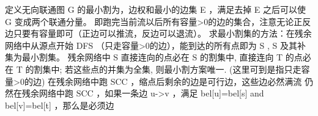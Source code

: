 \markdownRendererInterblockSeparator
{}定义无向联通图\markdownRendererDollarSign{} G \markdownRendererDollarSign{}的最小割为，边权和最小的边集\markdownRendererDollarSign{} E \markdownRendererDollarSign{}，满足去掉\markdownRendererDollarSign{} E \markdownRendererDollarSign{}之后可以使\markdownRendererDollarSign{} G \markdownRendererDollarSign{}变成两个联通分量。\markdownRendererInterblockSeparator
{}\markdownRendererInterblockSeparator
{}
\markdownRendererSectionEnd \markdownRendererSectionBegin
{}\markdownRendererInterblockSeparator
{}\markdownRendererSectionBegin
\markdownRendererSectionBegin
{}\markdownRendererInterblockSeparator
{}即跑完当前流以后所有容量>0的边的集合，注意无论正反边只要有容量即可（正边可以推流，反边可以退流）。\markdownRendererInterblockSeparator
{}
\markdownRendererSectionEnd \markdownRendererSectionBegin
{}\markdownRendererInterblockSeparator
{}求最小割集的方法：在残余网络中从源点开始\markdownRendererDollarSign{} DFS \markdownRendererDollarSign{}（只走容量>0的边），能到达的所有点即为\markdownRendererDollarSign{} S \markdownRendererDollarSign{},\markdownRendererDollarSign{} S \markdownRendererDollarSign{}及其补集为最小割集。\markdownRendererInterblockSeparator
{}
\markdownRendererSectionEnd \markdownRendererSectionBegin
{}\markdownRendererInterblockSeparator
{}残余网络中\markdownRendererDollarSign{} S \markdownRendererDollarSign{}直接连向的点必在\markdownRendererDollarSign{} S \markdownRendererDollarSign{}的割集中, 直接连向\markdownRendererDollarSign{} T \markdownRendererDollarSign{}的点必在\markdownRendererDollarSign{} T \markdownRendererDollarSign{}的割集中; 若这些点的并集为全集, 则最小割方案唯一.\markdownRendererParagraphSeparator
{}(这里可到是指只走容量>0的边)\markdownRendererInterblockSeparator
{}
\markdownRendererSectionEnd \markdownRendererSectionBegin
{}\markdownRendererInterblockSeparator
{}在残余网络中跑\markdownRendererDollarSign{} SCC \markdownRendererDollarSign{}，缩点后剩余的边是可行边，这些边必然满流\markdownRendererInterblockSeparator
{}
\markdownRendererSectionEnd \markdownRendererSectionBegin
{}\markdownRendererInterblockSeparator
{}仍然在残余网络中跑\markdownRendererDollarSign{} SCC \markdownRendererDollarSign{}，如果一条边\markdownRendererDollarSign{} u->v \markdownRendererDollarSign{}，满足\markdownRendererDollarSign{} bel[u]=bel[s] \markdownRendererBackslash{} and\markdownRendererBackslash{}  bel[v]=bel[t] \markdownRendererDollarSign{}，那么是必须边\markdownRendererInterblockSeparator
